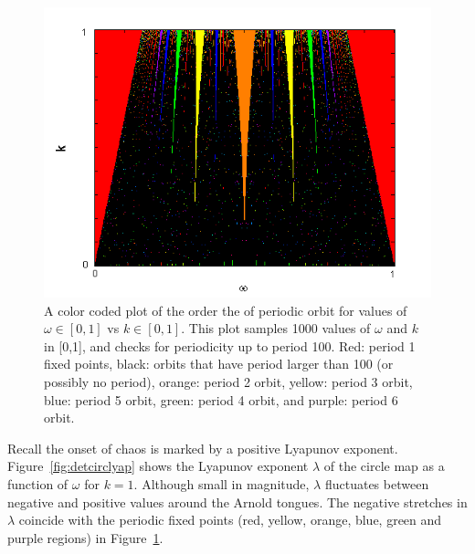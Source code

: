 \begin{figure}[!h]
\caption[The Arnold Tongues for the deterministic circle map]{A color coded
  plot of the order the of periodic orbit for values of $\omega \in [0,1]$ vs $k \in [0,1]$. This plot samples 1000 values of $\omega$ and $k$ in
  [0,1], and checks for periodicity up to period 100. Red: period 1
  fixed points, black: orbits that have period larger than 100 (or
  possibly no period), orange: period 2 orbit, yellow: period 3 orbit, blue: period 5 orbit,
green: period 4 orbit, and purple: period 6 orbit.}\label{fig:dettongues}
	\begin{center}
		\includegraphics[scale=0.65]{figs/tongues_1000_det.png}
	\end{center}
\end{figure}
Recall the onset of chaos is marked by a positive Lyapunov
exponent. Figure~\ref{fig:detcirclyap} shows the Lyapunov exponent
$\lambda$ of
the circle map as a function of $\omega$ for $k=1$. Although small in
magnitude, $\lambda$ fluctuates between negative and positive
values around the Arnold tongues. The negative stretches in $\lambda$
coincide with the periodic fixed points (red, yellow, orange, blue, green
and purple regions) in
Figure~\ref{fig:dettongues}.  
